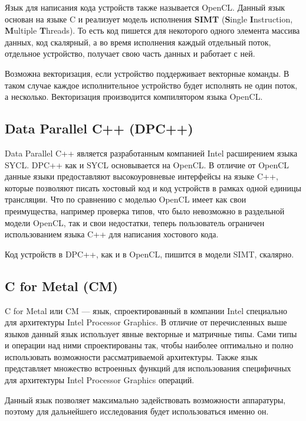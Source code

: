 Язык для написания кода устройств также называется OpenCL.
Данный язык основан на языке C и реализует модель исполнения \textbf{SIMT} (\foreignlanguage{english}{\textbf{S}ingle \textbf{I}nstruction, \textbf{M}ultiple \textbf{T}hreads}).
То есть код пишется для некоторого одного элемента массива данных, код скалярный, а во время исполнения каждый отдельный поток, отдельное устройство, получает свою часть данных и работает с ней.

Возможна векторизация, если устройство поддерживает векторные команды.
В таком случае каждое исполнительное устройство будет исполнять не один поток, а несколько.
Векторизация производится компилятором языка OpenCL.


\subsection{Data Parallel C++ (DPC++)}

Data Parallel C++ является разработанным компанией Intel расширением языка SYCL.
DPC++ как и SYCL основывается на OpenCL.
В отличие от OpenCL данные языки предоставляют высокоуровневые интерфейсы на языке C++, которые позволяют писать хостовый код и код устройств в рамках одной единицы трансляции.
Что по сравнению с моделью OpenCL имеет как свои преимущества, например проверка типов, что было невозможно в раздельной модели OpenCL, так и свои недостатки, теперь пользователь ограничен использованием языка C++ для написания хостового кода.

Код устройств в DPC++, как и в OpenCL, пишится в модели SIMT, скалярно.

\subsection{C for Metal (CM)}

C for Metal или CM --- язык, спроектированный в компании Intel специально для архитектуры \foreignlanguage{english}{Intel Processor Graphics}.
В отличие от перечисленных выше языков данный язык использует явные векторные и матричные типы.
Сами типы и операции над ними спроектированы так, чтобы наиболее оптимально и полно использовать возможности рассматриваемой архитектуры.
Также язык представляет множество встроенных функций для использования специфичных для архитектуры \foreignlanguage{english}{Intel Processor Graphics} операций.

Данный язык позволяет максимально задействовать возможности аппаратуры, поэтому для дальнейшего исследования будет использоваться именно он.


